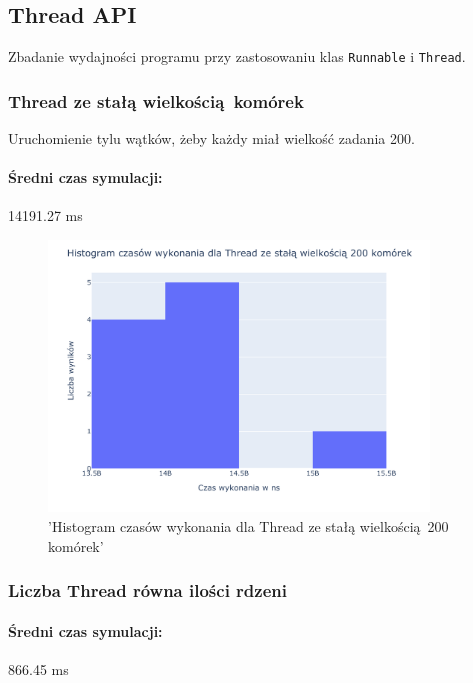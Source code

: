 \documentclass{mwart}
\begin{document}
\subsection{Thread API}
Zbadanie wydajności programu przy zastosowaniu klas \texttt{Runnable} i \texttt{Thread}.

\subsubsection{Thread ze stałą wielkością komórek}
Uruchomienie tylu wątków, żeby każdy miał wielkość zadania 200.
\paragraph{Średni czas symulacji: } 14191.27 ms


\begin{figure}[H]
  \centering
  \includegraphics[width=0.9\textwidth]{Parallel_Thread_fix_chunk_200_game_of_life_performance}
  \caption{'Histogram czasów wykonania dla Thread ze stałą wielkością 200 komórek'}
\end{figure}

\subsubsection{Liczba Thread równa ilości rdzeni}
\paragraph{Średni czas symulacji: } 866.45 ms
\end{document}

